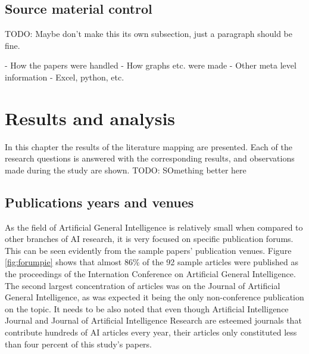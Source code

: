 \documentclass[utf8,english]{gradu3}
\begin{document}
\section{Source material control}

TODO: Maybe don't make this its own subsection, just a paragraph should be fine.

- How the papers were handled - How graphs etc. were made - Other meta level
information - Excel, python, etc.


\chapter{Results and analysis}
\label{results}

 In this chapter the results of the literature mapping are presented. Each of the research questions is answered with the corresponding results, and observations made during the study are shown. 
 TODO: SOmething better here

 \section{Publications years and venues}

 As the field of Artificial General Intelligence is relatively small when
 compared to other branches of AI research, it is very focused on specific
 publication forums. This can be seen evidently from the sample papers'
 publication venues. Figure \ref*{fig:forumpie} shows that almost 86\% of the 92
 sample articles were published as the proceedings of the Internation Conference
 on Artificial General Intelligence. The second largest concentration of
 articles was on the Journal of Artificial General Intelligence, as was expected
 it being the only non-conference publication on the topic. It needs to be also
 noted that even though Artificial Intelligence Journal and Journal of
 Artificial Intelligence Research are esteemed journals that contribute hundreds
 of AI articles every year, their articles only constituted less than four
 percent of this study's papers. 
\end{document}
